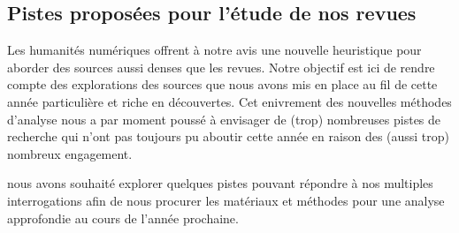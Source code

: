 \subsection*{Pistes proposées pour l'étude de nos revues}

Les humanités numériques offrent à notre avis une nouvelle heuristique pour aborder des sources aussi denses que les revues. Notre objectif est ici de rendre compte des explorations des sources que nous avons mis en place au fil de cette année particulière et riche en découvertes.
Cet enivrement des nouvelles méthodes d'analyse nous a par moment poussé à envisager de (trop) nombreuses pistes de recherche qui n'ont pas toujours pu aboutir cette année en raison des (aussi trop) nombreux engagement.

nous avons souhaité explorer quelques pistes pouvant répondre à nos multiples interrogations afin de nous procurer les matériaux et méthodes pour une analyse approfondie au cours de l'année prochaine.



